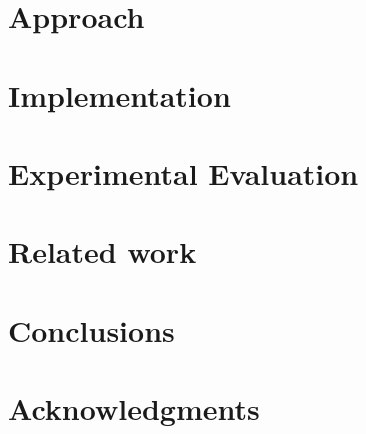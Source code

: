 \documentclass{sig-alternate-05-2015}
\begin{document}
\section{Approach}
\section{Implementation}
\section{Experimental Evaluation}
\section{Related work}
\section{Conclusions}


\section{Acknowledgments}


  
\end{document}
